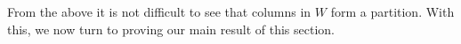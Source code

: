 \documentclass[11pt]{article}
\newcommand{\DD}{\diamondminus}
\newcommand{\DDI}{\diamondplus}
\begin{document}
 
From the above it is not difficult to see that columns in $W$ form a partition. With this, we now turn to proving our main result of this section.
 
\end{document}
